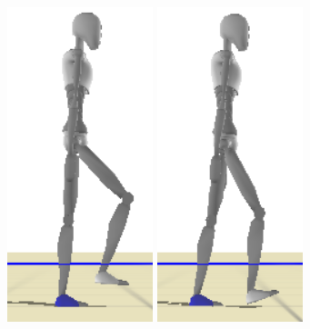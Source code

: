 \documentclass[conference]{acmsiggraph}
\begin{document}
\begin{figure}[t]
\includegraphics[scale=0.17]{images/strips/0_25/7.png}
\includegraphics[scale=0.17]{images/strips/0_25/8.png}


\end{figure}
\end{document}
